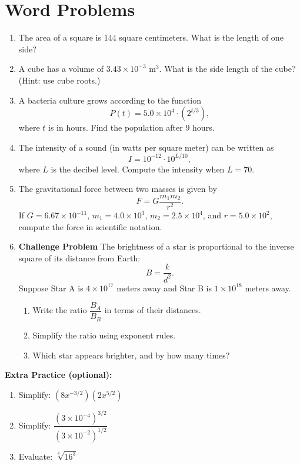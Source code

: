 \documentclass[11pt]{article}
\begin{document}
\section*{Word Problems}

\begin{enumerate}[label=\textbf{(\arabic*)}, itemsep=1.5em]
    \item The area of a square is \(144\) square centimeters.  
    What is the length of one side?

    \item A cube has a volume of \(3.43 \times 10^{-3} \text{ m}^3\).  
    What is the side length of the cube? (Hint: use cube roots.)

    \item A bacteria culture grows according to the function  
    \[
       P(t) = 5.0 \times 10^4 \cdot (2^{t/3}),
    \]
    where \(t\) is in hours.  
    Find the population after 9 hours.

    \item The intensity of a sound (in watts per square meter) can be written as  
    \[
       I = 10^{-12} \cdot 10^{L/10},
    \]
    where \(L\) is the decibel level.  
    Compute the intensity when \(L = 70\).

    \item The gravitational force between two masses is given by  
    \[
        F = G \dfrac{m_1 m_2}{r^2}.
    \]
    If \(G = 6.67 \times 10^{-11}\), \(m_1 = 4.0 \times 10^3\),  
    \(m_2 = 2.5 \times 10^{4}\), and \(r = 5.0 \times 10^2\), compute the force in scientific notation.

    \item \textbf{Challenge Problem}  
    The brightness of a star is proportional to the inverse square of its distance from Earth:
    \[
       B = \dfrac{k}{d^2}.
    \]
    Suppose Star A is \(4 \times 10^{17}\) meters away and Star B is \(1 \times 10^{18}\) meters away.  
    \begin{enumerate}[label=\textbf{(\alph*)}]
        \item Write the ratio \(\dfrac{B_A}{B_B}\) in terms of their distances.
        \item Simplify the ratio using exponent rules.
        \item Which star appears brighter, and by how many times?
    \end{enumerate}
\end{enumerate}

\bigskip

\noindent\textbf{Extra Practice (optional):}
\begin{enumerate}[label=\textbf{(\alph*)}, itemsep=0.5em]
    \item Simplify: \((8x^{-3/2}) (2x^{5/2})\)
    \item Simplify: \(\dfrac{(3 \times 10^{-4})^{3/2}}{(3 \times 10^{-2})^{1/2}}\)
    \item Evaluate: \(\sqrt[4]{16^3}\)
\end{enumerate}
\end{document}
